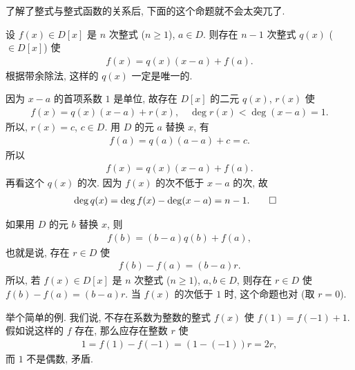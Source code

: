 了解了整式与整式函数的关系后, 下面的这个命题就不会太突兀了.

\begin{proposition}
    设 $f(x) \in D[x]$ 是 $n$ 次整式 ($n \geq 1$), $a \in D$. 则存在 $n-1$ 次整式 $q(x)$ ($\in D[x]$) 使
    \begin{align*}
        f(x) = q(x) (x-a) + f(a).
    \end{align*}
    根据带余除法, 这样的 $q(x)$ 一定是唯一的.
\end{proposition}

\begin{pf}
    因为 $x-a$ 的首项系数 $1$ 是单位, 故存在 $D[x]$ 的二元 $q(x)$, $r(x)$ 使
    \begin{align*}
        f(x) = q(x) (x-a) + r(x), \quad \deg r(x) < \deg (x-a) = 1.
    \end{align*}
    所以, $r(x) = c$, $c \in D$. 用 $D$ 的元 $a$ 替换 $x$, 有
    \begin{align*}
        f(a) = q(a) (a-a) + c = c.
    \end{align*}
    所以
    \begin{align*}
        f(x) = q(x) (x-a) + f(a).
    \end{align*}
    再看这个 $q(x)$ 的次. 因为 $f(x)$ 的次不低于 $x-a$ 的次, 故
    \begin{align*}
         & \deg q(x) = \deg f(x) - \deg (x-a) = n-1. \qedhere
    \end{align*}
\end{pf}

\begin{remark}
    如果用 $D$ 的元 $b$ 替换 $x$, 则
    \begin{align*}
        f(b) = (b-a)q(b) + f(a),
    \end{align*}
    也就是说, 存在 $r \in D$ 使
    \begin{align*}
        f(b) - f(a) = (b-a)r.
    \end{align*}
    所以, 若 $f(x) \in D[x]$ 是 $n$ 次整式 ($n \geq 1$), $a,b \in D$, 则存在 $r \in D$ 使 $f(b) - f(a) = (b-a)r$. 当 $f(x)$ 的次低于 $1$ 时, 这个命题也对 (取 $r=0$).

    举个简单的例. 我们说, 不存在系数为整数的整式 $f(x)$ 使 $f(1) = f(-1) + 1$. 假如说这样的 $f$ 存在, 那么应存在整数 $r$ 使
    \begin{align*}
        1 = f(1) - f(-1) = (1 - (-1))r = 2r,
    \end{align*}
    而 $1$ 不是偶数, 矛盾.
\end{remark}

